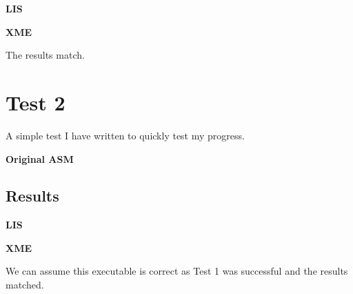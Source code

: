 \documentclass[titlepage, 10pt]{article}
\begin{document}
\textbf{LIS}

\textbf{XME}


The results match.

\section{Test 2}
A simple test I have written to quickly test my progress.

\textbf{Original ASM}

\subsection{Results}
\textbf{LIS}

\textbf{XME}


We can assume this executable is correct as Test 1 was successful and the results matched.
\end{document}
